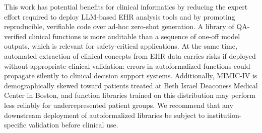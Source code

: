 This work has potential benefits for clinical informatics by reducing the expert effort required to deploy LLM-based EHR analysis tools and by promoting reproducible, verifiable code over ad-hoc zero-shot generation. A library of QA-verified clinical functions is more auditable than a sequence of one-off model outputs, which is relevant for safety-critical applications. At the same time, automated extraction of clinical concepts from EHR data carries risks if deployed without appropriate clinical validation: errors in autoformalized functions could propagate silently to clinical decision support systems. Additionally, MIMIC-IV is demographically skewed toward patients treated at Beth Israel Deaconess Medical Center in Boston, and function libraries trained on this distribution may perform less reliably for underrepresented patient groups. We recommend that any downstream deployment of autoformalized libraries be subject to institution-specific validation before clinical use.
